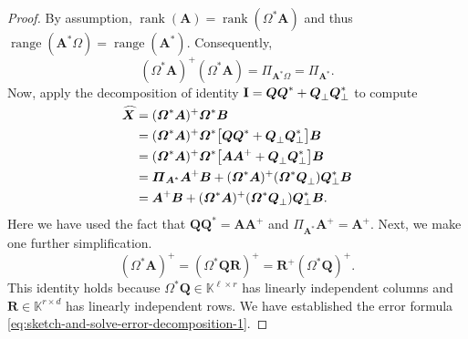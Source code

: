 \documentclass[11pt]{article}
\newcommand{\field}{\mathbb{K}}
\DeclareMathOperator{\range}{range}
\DeclareMathOperator{\rank}{rank}
\newcommand{\mat}[1]{\boldsymbol{#1}}
\newcommand{\Id}{\mathbf{I}}
\newcommand{\hatbold}[1]{%
  \skew{4}\widehat{\smash{\boldsymbol{#1}}\mathstrut}}
\newcommand{\Xhat}{\smash{\hatbold{X}}}
\theoremstyle{definition}
\numberwithin{equation}{section}
\begin{document}
\begin{proof}
By assumption, $\rank(\mat{A}) = \rank(\mat{\varOmega}^* \mat{A})$ and thus $\range(\mat{A}^* \mat{\varOmega}) = \range(\mat{A}^*)$.
Consequently,
\begin{equation*}
    (\mat{\varOmega}^* \mat{A})^+ (\mat{\varOmega}^* \mat{A})
    = \mat{\varPi}_{\mat{A}^* \mat{\varOmega}}
    = \mat{\varPi}_{\mat{A}^*}.
\end{equation*}
Now, apply the decomposition of identity $\Id = \mat{Q}\mat{Q}^* + \mat{Q}_\perp^{\vphantom{*}} \mat{Q}_\perp^*$ to compute
%
\begin{align*}
    \Xhat &= (\mat{\varOmega}^*\mat{A})^+ \mat{\varOmega}^*\mat{B} \\
    &= (\mat{\varOmega}^*\mat{A})^+ \mat{\varOmega}^*\bigl[\mat{Q} \mat{Q}^* + \mat{Q}_{\perp}^{\vphantom{*}} \mat{Q}_{\perp}^*\bigr] \mat{B} \\
    &= (\mat{\varOmega}^*\mat{A})^+ \mat{\varOmega}^*\bigl[\mat{A} \mat{A}^+ + \mat{Q}_{\perp}^{\vphantom{*}} \mat{Q}_{\perp}^*\bigr] \mat{B} \\
    &= \mat{\varPi}_{\mat{A}^*} \mat{A}^+ \mat{B}
    + (\mat{\varOmega}^*\mat{A})^+ (\mat{\varOmega}^* \mat{Q}_{\perp}^{\vphantom{*}}) \mat{Q}_{\perp}^* \mat{B} \\
    &= \mat{A}^+ \mat{B} + (\mat{\varOmega}^*\mat{A})^+ (\mat{\varOmega}^* \mat{Q}_{\perp}^{\vphantom{*}}) \mat{Q}_{\perp}^* \mat{B}.
\end{align*}
%
Here we have used the fact that $\mat{Q} \mat{Q}^* = \mat{A} \mat{A}^+$ and $\mat{\varPi}_{\mat{A}^*} \mat{A}^+ = \mat{A}^+$.
Next, we make one further simplification.
%
\begin{equation*}
    (\mat{\varOmega}^*\mat{A})^+
    = (\mat{\varOmega}^* \mat{Q} \mat{R})^+
    = \mat{R}^+ (\mat{\varOmega}^* \mat{Q})^+.
\end{equation*}
%
This identity holds because $\mat{\varOmega}^* \mat{Q} \in \field^{\ell \times r}$ has linearly independent columns and $\mat{R} \in \field^{r \times d}$ has linearly independent rows.
We have established the error formula \cref{eq:sketch-and-solve-error-decomposition-1}.


\end{proof}
\end{document}
